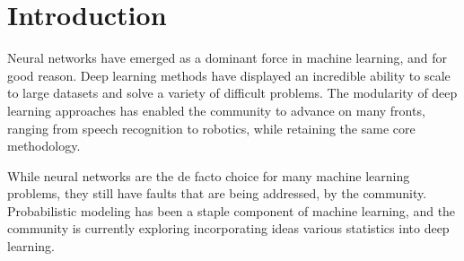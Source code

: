 \chapter{Introduction}

Neural networks have emerged
as a dominant force
in machine learning,
and for good reason.
Deep learning methods
have displayed an incredible
ability to scale to large datasets
and solve a variety of
difficult problems.
The modularity of deep learning 
approaches has enabled the community
to advance on many fronts,
ranging from speech recognition
to robotics, while retaining
the same core methodology.

While neural networks
are the de facto choice
for many machine learning problems,
they still have faults
that are being addressed,
by the community.
Probabilistic modeling has been a staple
component of machine learning,
and the community
is currently exploring
incorporating ideas
various statistics into deep learning.
